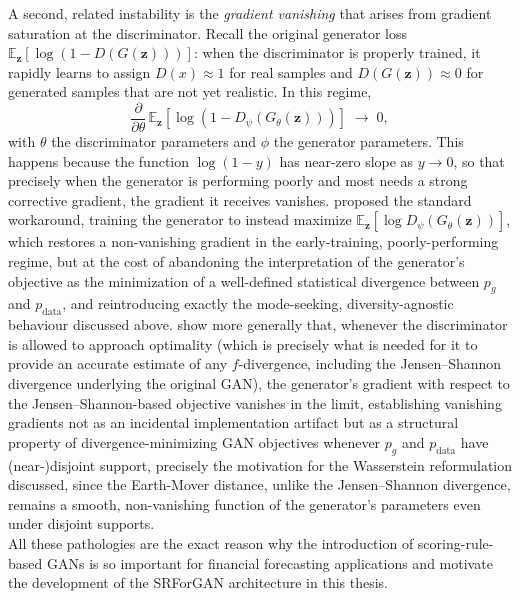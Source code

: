 A second, related instability is the \emph{gradient vanishing} that arises from gradient saturation at the discriminator.
Recall the original generator loss $\mathbb{E}_{\mathbf z}[\log(1 - D(G(\mathbf z)))]$:
when the discriminator is properly trained, 
it rapidly learns to assign $D(x) \approx 1$
for real samples and $D(G(\mathbf z)) \approx 0$ 
for generated samples that are not yet realistic. 
In this regime,
\begin{equation}
\frac{\partial}{\partial \theta} \, \mathbb{E}_{\mathbf z}\left[ \log\left(1 - D_\psi(G_\theta(\mathbf z))\right) \right] \; \longrightarrow \; 0,
\end{equation}
with $\theta$ the discriminator parameters and $\phi$ the generator parameters. This happens because
the function $\log(1-y)$ has near-zero slope as $y \to 0$, 
so that precisely when the generator is performing poorly and most needs a strong corrective gradient,
the gradient it receives vanishes. 
\cite{background:gan} proposed the standard workaround, training the generator to instead maximize $\mathbb{E}_{\mathbf z}[\log D_\psi(G_\theta(\mathbf z))]$, which restores a non-vanishing gradient in the early-training, 
poorly-performing regime, but at the cost of abandoning the interpretation of the generator's objective 
as the minimization of a well-defined statistical divergence between $p_g$ and $p_{\mathrm{data}}$,
and reintroducing exactly the mode-seeking, 
diversity-agnostic behaviour discussed above. 
\cite{background:wgan} show more generally that, 
whenever the discriminator is allowed to approach optimality 
(which is precisely what is needed for it to provide an accurate estimate of any $f$-divergence, including the Jensen--Shannon divergence underlying the original GAN), 
the generator's gradient with respect to the Jensen--Shannon-based objective vanishes in the limit, 
establishing vanishing gradients not as an incidental implementation 
artifact but as a structural property of divergence-minimizing GAN objectives whenever $p_g$ and $p_{\mathrm{data}}$ 
have (near-)disjoint support, precisely the motivation for the Wasserstein reformulation discussed, since the Earth-Mover distance, unlike the Jensen--Shannon divergence, 
remains a smooth, non-vanishing function of the generator's parameters even under disjoint supports.\\

All these pathologies are the exact reason why the introduction
of scoring-rule-based GANs is so important for financial forecasting applications and 
motivate the development of the SRForGAN architecture in this thesis.
































